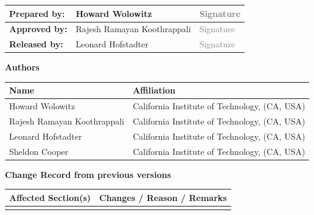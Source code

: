 \documentclass[12pt,a4paper]{article}
\begin{document}
\vspace{3cm}

\begin{center}
  \begin{tabularx}{\textwidth}{|l|X|l|}
    \hline
    {\bf \small Prepared by:} &  Howard Wolowitz               & \textcolor{gray}{Signature} \\[0.8cm] \hline
    {\bf \small Approved by:} &  Rajesh Ramayan Koothrappali   & \textcolor{gray}{Signature} \\[0.8cm] \hline
    {\bf \small Released by:} &  Leonard Hofstadter            & \textcolor{gray}{Signature} \\[0.8cm] \hline
  \end{tabularx}
\end{center}


\restoregeometry



\newpage
\pagestyle{fancy}

\noindent
{\Large \bf Authors}
\medskip

\noindent
\begin{tabularx}{\textwidth}{|l|X|}
  \hline
      {\bf Name} & {\bf Affiliation}\\
      \hline
      Howard Wolowitz                 & California Institute of Technology, (CA, USA)\\
      Rajesh Ramayan Koothrappali     & California Institute of Technology, (CA, USA)\\
      Leonard Hofstadter              & California Institute of Technology, (CA, USA)\\
      Sheldon Cooper                  & California Institute of Technology, (CA, USA)\\
      \hline
\end{tabularx}

\vspace{3cm}

\noindent
{\Large \bf Change Record from previous versions}
\medskip

\noindent
\begin{tabularx}{\textwidth}{|l|X|}
  \hline
      {\bf Affected Section(s)} & {\bf Changes / Reason / Remarks}\\
      \hline
       & \\
      \hline
\end{tabularx}


\newpage
\tableofcontents \thispagestyle{fancy}


\newpage





\newpage
\listofreq \thispagestyle{fancy}

\listofquestion \thispagestyle{fancy}


\label{LastPage}
\end{document}
